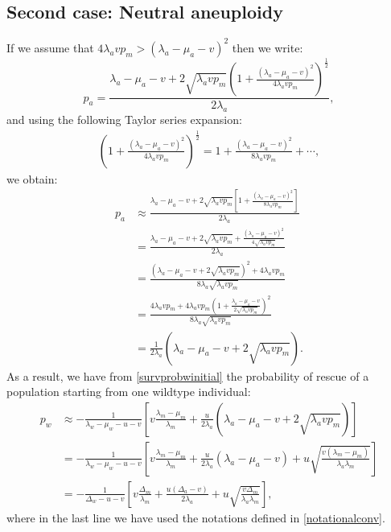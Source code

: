 \documentclass[12pt]{extarticle}
\begin{document}
\subsection*{Second case: Neutral aneuploidy}
If we assume that  $4\lambda_avp_m>\left(\lambda_a-\mu_a-v\right)^2$ then we write:
\begin{equation}
p_a=\frac{\lambda_a-\mu_a-v+2\sqrt{\lambda_a vp_m}\left(1+\frac{\left(\lambda_a-\mu_a-v\right)^2}{4\lambda_avp_m}\right)^{\frac12}}{2\lambda_a},
\end{equation}
and using the following Taylor series expansion:
\begin{align*}
\left(1+\frac{\left(\lambda_a-\mu_a-v\right)^2}{4\lambda_avp_m}\right)^{\frac{1}{2}}=1+\frac{\left(\lambda_a-\mu_a-v\right)^2}{8\lambda_avp_m}+\cdots,
\end{align*}
we obtain:
\begin{align*}
p_a&\approx\frac{\lambda_a-\mu_a-v+2\sqrt{\lambda_a vp_m}\left[1+\frac{\left(\lambda_a-\mu_a-v\right)^2}{8\lambda_avp_m}\right]}{2\lambda_a}\\
&=\frac{\lambda_a-\mu_a-v+2\sqrt{\lambda_a vp_m}+\frac{\left(\lambda_a-\mu_a-v\right)^2}{4\sqrt{\lambda_avp_m}}}{2\lambda_a}\\
&=\frac{\left(\lambda_a-\mu_a-v+2\sqrt{\lambda_avp_m}\right)^2+4\lambda_avp_m}{8\lambda_a\sqrt{\lambda_avp_m}}\\
&=\frac{4\lambda_avp_m+4\lambda_avp_m\left(1+\frac{\lambda_a-\mu_a-v}{2\sqrt{\lambda_avp_m}}\right)^2}{8\lambda_a\sqrt{\lambda_avp_m}}\\
&=\frac{1}{2\lambda_a}\left(\lambda_a-\mu_a-v+2\sqrt{\lambda_avp_m}\right).
\end{align*}
As a result, we have from \eqref{survprobwinitial} the probability of rescue of a population starting from one wildtype individual:
\begin{align*}
p_w&\approx-\frac{1}{\lambda_w-\mu_w-u-v}\left[v\frac{\lambda_m-\mu_m}{\lambda_m}+\frac{u}{2\lambda_a}\left(\lambda_a-\mu_a-v+2\sqrt{\lambda_avp_m}\right)\right]\\
&=-\frac{1}{\lambda_w-\mu_w-u-v}\left[v\frac{\lambda_m-\mu_m}{\lambda_m}+\frac{u}{2\lambda_a}\left(\lambda_a-\mu_a-v\right)+u\sqrt{\frac{v\left(\lambda_m-\mu_m\right)}{\lambda_a\lambda_m}}\right]\\
&=-\frac{1}{\Delta_w-u-v}\left[v\frac{\Delta_m}{\lambda_m}+\frac{u\left(\Delta_a-v\right)}{2\lambda_a}+u\sqrt{\frac{v\Delta_m}{\lambda_a\lambda_m}}\right],
\end{align*}
where in the last line we have used the notations defined in \eqref{notationalconv}.
\end{document}
